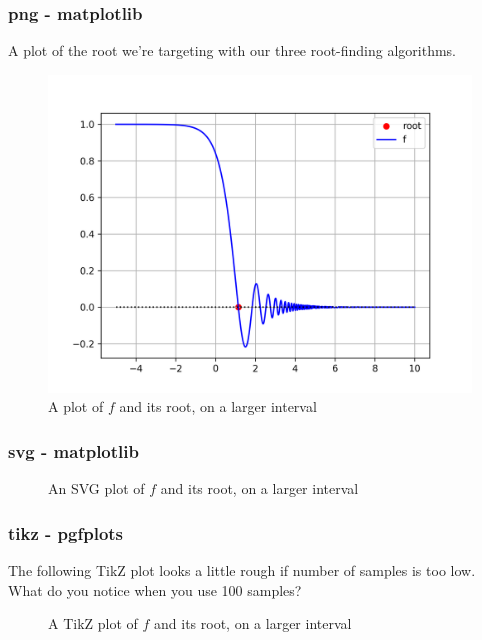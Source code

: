 \documentclass{article}
\begin{document}
\subsubsection{png - matplotlib}

A plot of the root we're targeting with our three root-finding algorithms.


\begin{figure}[h]
  \centering
  \includegraphics[scale=0.8]{./plots/ffull}
  \caption{A plot of $f$ and its root, on a larger interval}
\end{figure}

\subsubsection{svg - matplotlib}

\begin{figure}[h]
  \centering
  \caption{An SVG plot of $f$ and its root, on a larger interval}
\end{figure}

\subsubsection{tikz - pgfplots}


The following TikZ plot looks a little rough if number of samples
is too low. What do you notice when you use 100 samples?

\begin{figure}[h]
  \centering
  \caption{A TikZ plot of $f$ and its root, on a larger interval}
\end{figure}
\end{document}
